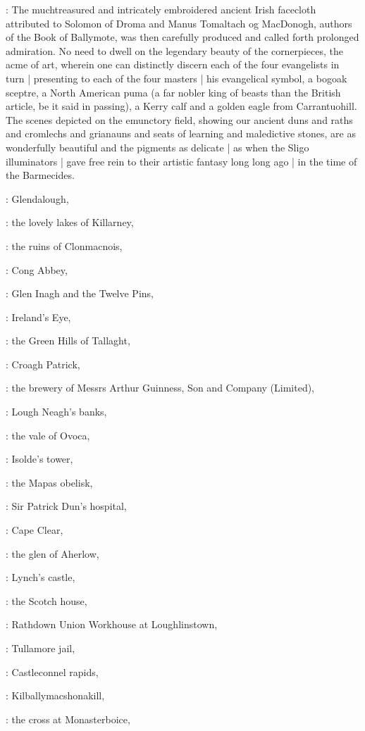 :
The muchtreasured and intricately embroidered ancient Irish
facecloth attributed to Solomon of Droma and Manus Tomaltach og MacDonogh,
authors of the Book of Ballymote,
was then carefully produced and called forth prolonged admiration.
No need to dwell on the legendary beauty of the cornerpieces,
the acme of art,
wherein one can distinctly discern each of the four evangelists in turn |
presenting to each of the four masters |
his evangelical symbol,
a bogoak sceptre,
a North American puma
(a far nobler king of beasts than the British article,
be it said in passing),
a Kerry calf and a golden eagle from Carrantuohill.
The scenes depicted on the emunctory field,
showing our ancient duns and raths
and cromlechs and grianauns and seats of learning and maledictive stones,
are as wonderfully beautiful and the pigments as delicate |
as when the Sligo illuminators |
gave free rein to their artistic fantasy
long long ago |
in the time of the Barmecides.

:
Glendalough,

:
the lovely lakes of Killarney,

:
the ruins of Clonmacnois,

:
Cong Abbey,

:
Glen Inagh and the Twelve Pins,

:
Ireland's Eye,

:
the Green Hills of Tallaght,

:
Croagh Patrick,

:
the brewery of Messrs Arthur Guinness,
Son and Company (Limited),

:
Lough Neagh's banks,

:
the vale of Ovoca,

:
Isolde's tower,

:
the Mapas obelisk,

:
Sir Patrick Dun's hospital,

:
Cape Clear,

:
the glen of Aherlow,

:
Lynch's castle,

:
the Scotch house,

:
Rathdown Union Workhouse at Loughlinstown,

:
Tullamore jail,

:
Castleconnel rapids,

:
Kilballymacshonakill,

:
the cross at Monasterboice,

